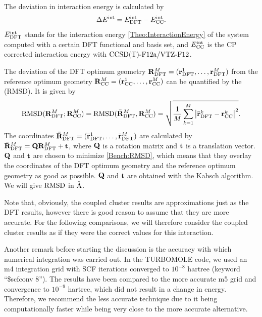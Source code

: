 The deviation in interaction energy is calculated by 
\newcommand\ecc{\enmat{\eint_{\te {CC}}}}
\begin{equation}
\Dl\eint=\eint\dft-\ecc.
\label{Bench:RefEnergy}
\end{equation}
$E^{\text{int}}_{\text{DFT}}$ stands for the interaction energy \eqref{Theo:InteractionEnergy} of
the system computed with a certain DFT functional and basis set, and $\ecc$ is
the CP corrected interaction energy with $\text{CCSD(T)-F12a}/\text{VTZ-F}12$.

The deviation of the DFT optimum geometry \mbox{$\mathbf{R}^M_{\text{DFT}}=(\mathbf{r}^1_{\text{DFT}},\ldots,\mathbf{r}^M_{\text{DFT}})$} from the reference optimum geometry
\mbox{$\mathbf{R}^M_{\text{CC}}=(\mathbf{r}^1_{\text{CC}},\ldots,\mathbf{r}^M_{\text{CC}})$} can be quantified by the  (RMSD). It is given by
\newcommand{\DRMSD}{\te{RMSD}}
\begin{equation}
\DRMSD(\bo R^M\dft;\bo R^M\cc)= \DRMSD(\bar{\bo R}^M\dft,\bo R^M\cc)=
\sqrt{\frac 1 M \sum_{k=1}^M \abs{\bar \r^k\dft-\r^k\cc}^2}.
\label{Bench:RMSD}
\end{equation}
The coordinates $\bar {\mathbf{R}}^M_{\text{DFT}}=(\bar {\mathbf{r}}^1_{\text{DFT}},\ldots,\bar {\mathbf{r}}^M_{\text{DFT}})$ are
calculated by $\bar {\mathbf{R}}^M_{\text{DFT}}= \mathbf{Q} \mathbf{R}^M_{\text{DFT}} + \mathbf{t}$, where $\mathbf{Q}$ is
a rotation matrix and $\mathbf{t}$ is a translation vector. $\mathbf{Q}$ and $\mathbf{t}$ are
chosen to minimize \eqref{Bench:RMSD}, which means that they overlay the
coordinates of the DFT optimum geometry and the reference optimum geometry as
good as possible. $\mathbf{Q}$ and $\mathbf{t}$ are obtained with the Kabsch
algorithm.\cite{Kabsch1978} We will give $\DRMSD$ in $\mathring{\text{A}}$.

Note that, obviously, the coupled cluster results are approximations just as the DFT results, however
there is good reason to assume that they are more accurate. For the following comparisons, we will
therefore consider the coupled cluster results as if they were the correct values for this
interaction.

Another remark before starting the discussion is the accuracy with which
numerical integration was carried out. In the \mbox{TURBOMOLE} code, we used an
m4 integration grid with SCF iterations converged to
$10^{-8}$ hartree (keyword ``\$scfconv 8''). The results have been compared to
the more accurate m5 grid and convergence to $10^{-9}$ hartree, which did not result in a change in
energy.\cite{TURBOMOLE,TreutlerAhlrichs1995}
Therefore, we recommend the less accurate technique due to it being
computationally faster while being very close to the more accurate alternative.

